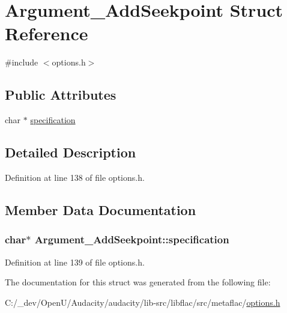 \hypertarget{struct_argument___add_seekpoint}{}\section{Argument\+\_\+\+Add\+Seekpoint Struct Reference}
\label{struct_argument___add_seekpoint}


{\ttfamily \#include $<$options.\+h$>$}

\subsection*{Public Attributes}
\begin{DoxyCompactItemize}
\item 
char $\ast$ \hyperlink{struct_argument___add_seekpoint_a15dc6e3331fbe07185ec847c87e27fc1}{specification}
\end{DoxyCompactItemize}


\subsection{Detailed Description}


Definition at line 138 of file options.\+h.



\subsection{Member Data Documentation}
\subsubsection[{\texorpdfstring{specification}{specification}}]{\setlength{\rightskip}{0pt plus 5cm}char$\ast$ Argument\+\_\+\+Add\+Seekpoint\+::specification}\hypertarget{struct_argument___add_seekpoint_a15dc6e3331fbe07185ec847c87e27fc1}{}\label{struct_argument___add_seekpoint_a15dc6e3331fbe07185ec847c87e27fc1}


Definition at line 139 of file options.\+h.



The documentation for this struct was generated from the following file\+:\begin{DoxyCompactItemize}
\item 
C\+:/\+\_\+dev/\+Open\+U/\+Audacity/audacity/lib-\/src/libflac/src/metaflac/\hyperlink{libflac_2src_2metaflac_2options_8h}{options.\+h}\end{DoxyCompactItemize}
